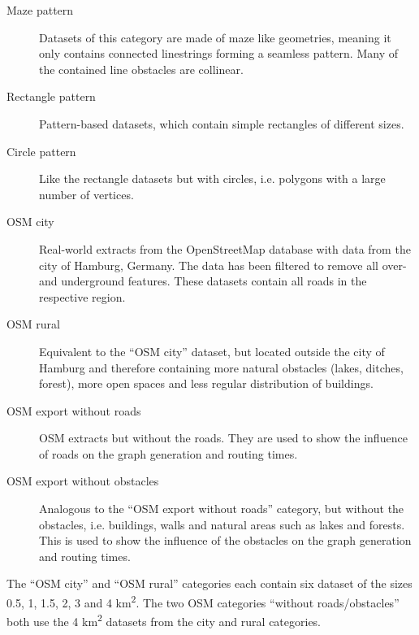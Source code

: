 			\begin{description}
				\item[Maze pattern] Datasets of this category are made of maze like geometries, meaning it only contains connected linestrings forming a seamless pattern. Many of the contained line obstacles are collinear.
				\item[Rectangle pattern] Pattern-based datasets, which contain simple rectangles of different sizes.
				\item[Circle pattern] Like the rectangle datasets but with circles, i.e. polygons with a large number of vertices.
				\item[OSM city] Real-world extracts from the OpenStreetMap database with data from the city of Hamburg, Germany. The data has been filtered to remove all over- and underground features. These datasets contain all roads in the respective region.
				\item[OSM rural] Equivalent to the \enquote{OSM city} dataset, but located outside the city of Hamburg and therefore containing more natural obstacles (lakes, ditches, forest), more open spaces and less regular distribution of buildings.
				\item[OSM export without roads] OSM extracts but without the roads. They are used to show the influence of roads on the graph generation and routing times.
				\item[OSM export without obstacles] Analogous to the \enquote{OSM export without roads} category, but without the obstacles, i.e. buildings, walls and natural areas such as lakes and forests. This is used to show the influence of the obstacles on the graph generation and routing times.
			\end{description}
			The \enquote{OSM city} and \enquote{OSM rural} categories each contain six dataset of the sizes 0.5, 1, 1.5, 2, 3 and 4 km\textsuperscript{2}.
			The two OSM categories \enquote{without roads/obstacles} both use the 4 km\textsuperscript{2} datasets from the city and rural categories.
			
